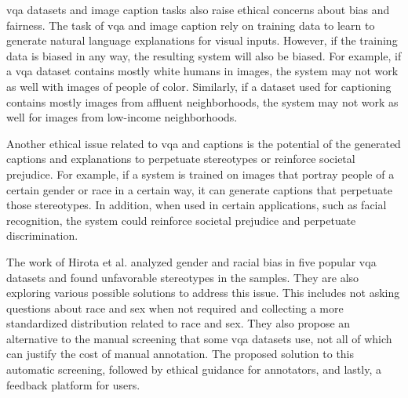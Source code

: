 \begin{comment}
Another ethical issue with \gls{xai} is the possibility that the system will be used for surveillance or other privacy-intrusive purposes. For example, an \gls{xai} system used to monitor people in public spaces could raise concerns about civil liberties and privacy rights. In addition, \gls{xai} systems capable of understanding and interpreting visual or textual information could also be used to profile individuals based on their race, gender, age, or other personal characteristics.
\end{comment}


\gls{vqa} datasets and image caption tasks also raise ethical concerns about bias and fairness. The task of \gls{vqa} and image caption rely on training data to learn to generate natural language explanations for visual inputs. However, if the training data is biased in any way, the resulting system will also be biased. For example, if a \gls{vqa} dataset contains mostly white humans in images, the system may not work as well with images of people of color. Similarly, if a dataset used for captioning contains mostly images from affluent neighborhoods, the system may not work as well for images from low-income neighborhoods. 

Another ethical issue related to \gls{vqa} and captions is the potential of the generated captions and explanations to perpetuate stereotypes or reinforce societal prejudice. For example, if a system is trained on images that portray people of a certain gender or race in a certain way, it can generate captions that perpetuate those stereotypes. In addition, when used in certain applications, such as facial recognition, the system could reinforce societal prejudice and perpetuate discrimination.

The work of Hirota et al. \cite{hirotaGenderRacialBias2022} analyzed gender and racial bias in five popular \gls{vqa} datasets and found unfavorable stereotypes in the samples. They are also exploring various possible solutions to address this issue. This includes not asking questions about race and sex when not required and collecting a more standardized distribution related to race and sex. They also propose an alternative to the manual screening that some \gls{vqa} datasets use, not all of which can justify the cost of manual annotation. The proposed solution to this automatic screening, followed by ethical guidance for annotators, and lastly, a feedback platform for users. 



